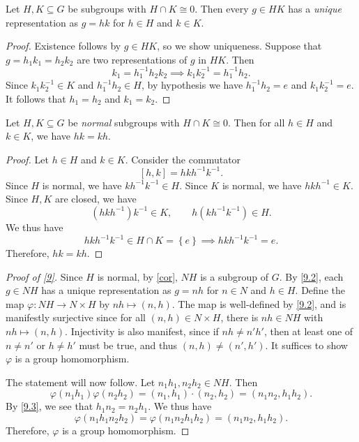 \documentclass[11pt, letterpaper]{article}
\theoremstyle{plain}
\begin{document}
\begin{lemma}\label{9.2}
	Let $H,K\subseteq G$ be subgroups with $H \cap K\cong 0$. Then every $g\in HK$ has a \emph{unique} representation as $g=hk$ for $h\in H$ and $k\in K$.
\end{lemma}
\begin{proof}
	Existence follows by $g\in HK$, so we show uniqueness. Suppose that $g=h_1k_1=h_2k_2$ are two representations of $g$ in $HK$. Then
	\[
		k_1=h_1^{-1} h_2k_2 \implies k_1k_2^{-1} =h_1^{-1} h_2
	.\]
	Since $k_1k_2^{-1} \in K$ and $h_1^{-1} h_2\in H$, by hypothesis we have $h_1^{-1} h_2=e$ and $k_1k_2^{-1} =e$. It follows that $h_1=h_2 $ and $k_1=k_2$.
\end{proof}

\begin{lemma}\label{9.3}
	Let $H,K\subseteq G$ be \emph{normal} subgroups with $H \cap K\cong 0$. Then for all $h\in H$ and $k\in K$, we have $hk=kh$.
\end{lemma}
\begin{proof}
	Let $h\in H$ and $k\in K$. Consider the commutator
	\[
		[h,k]=hkh^{-1} k^{-1} 
	.\]
	Since $H$ is normal, we have $kh^{-1} k^{-1} \in H$. Since $K$ is normal, we have $hkh^{-1} \in K$. Since $H,K$ are closed, we have
	\[
		\left( hkh^{-1}  \right) k^{-1} \in K,\qquad h\left( kh^{-1} k^{-1}  \right) \in H
	.\]
	We thus have
	\[
		hkh^{-1} k^{-1} \in H \cap K = \left\{ e \right\} \implies hkh^{-1} k^{-1} =e
	.\]
	Therefore, $hk=kh$.
\end{proof}


\begin{proof}[Proof of \cref{9}]
	Since $H$ is normal, by \cref{cor}, $NH$ is a subgroup of $G$. By \cref{9.2}, each $g\in NH$ has a unique representation as $g=nh$ for $n\in N$ and $h\in H$. Define the map $\varphi : NH \to N\times H$ by $nh\mapsto (n,h)$. The map is well-defined by \cref{9.2}, and is manifestly surjective since for all $(n,h)\in N\times H$, there is $nh\in NH$ with $nh\mapsto (n,h)$. Injectivity is also manifest, since if $nh\neq n'h'$, then at least one of $n\neq n'$ or $h\neq h'$ must be true, and thus $(n,h)\neq (n',h')$. It suffices to show $\varphi $ is a group homomorphism.

	The statement will now follow. Let $n_1h_1,n_2h_2\in NH$. Then
	\[
		\varphi (n_1h_1)\varphi (n_2h_2)=(n_1,h_1)\cdot (n_2,h_2)=(n_1n_2,h_1h_2).
	\]
	By \cref{9.3}, we see that $h_1n_2=n_2h_1$. We thus have
	\[
		\varphi (n_1h_1n_2h_2)=\varphi (n_1n_2h_1h_2)=(n_1n_2,h_1h_2)
	.\]
	Therefore, $\varphi $ is a group homomorphism.
\end{proof}
\end{document}
